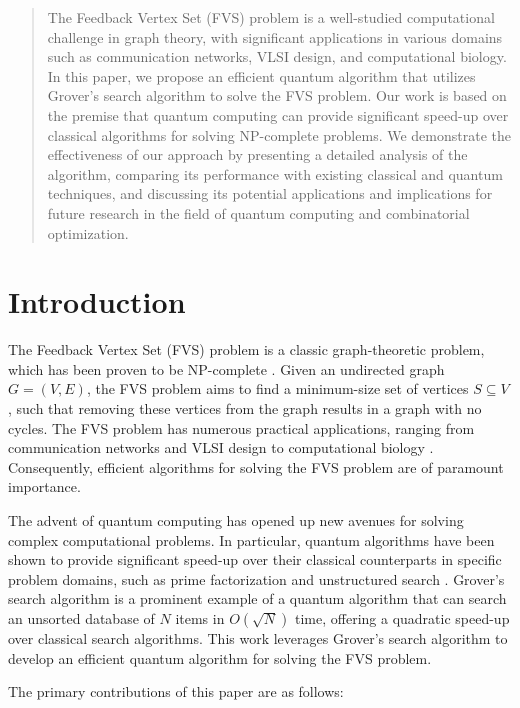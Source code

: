\begin{abstract}
The Feedback Vertex Set (FVS) problem is a well-studied computational challenge in graph theory, with significant applications in various domains such as communication networks, VLSI design, and computational biology. In this paper, we propose an efficient quantum algorithm that utilizes Grover's search algorithm to solve the FVS problem. Our work is based on the premise that quantum computing can provide significant speed-up over classical algorithms for solving NP-complete problems. We demonstrate the effectiveness of our approach by presenting a detailed analysis of the algorithm, comparing its performance with existing classical and quantum techniques, and discussing its potential applications and implications for future research in the field of quantum computing and combinatorial optimization.

\end{abstract}

\section{Introduction}

The Feedback Vertex Set (FVS) problem is a classic graph-theoretic problem, which has been proven to be NP-complete \cite{fvs_nphard}. Given an undirected graph $G=(V,E)$, the FVS problem aims to find a minimum-size set of vertices $S \subseteq V$, such that removing these vertices from the graph results in a graph with no cycles. The FVS problem has numerous practical applications, ranging from communication networks and VLSI design to computational biology \cite{fvs_applications}. Consequently, efficient algorithms for solving the FVS problem are of paramount importance.

The advent of quantum computing has opened up new avenues for solving complex computational problems. In particular, quantum algorithms have been shown to provide significant speed-up over their classical counterparts in specific problem domains, such as prime factorization and unstructured search \cite{shor, grover}. Grover's search algorithm \cite{grover} is a prominent example of a quantum algorithm that can search an unsorted database of $N$ items in $O(\sqrt{N})$ time, offering a quadratic speed-up over classical search algorithms. This work leverages Grover's search algorithm to develop an efficient quantum algorithm for solving the FVS problem.

The primary contributions of this paper are as follows:

